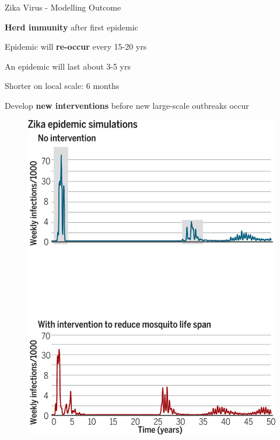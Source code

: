 \documentclass[table,notes]{beamer}\usepackage[]{graphicx}\usepackage[]{color}
\begin{document}
\begin{frame}[fragile]{Zika Virus - Modelling Outcome} %

\begin{minipage}{.52\textwidth}
\textbf{Herd immunity} after first epidemic  \par
\vspace{0.3cm}
Epidemic will \textbf{re-occur} every 15-20 yrs \par
\vspace{0.3cm}
An epidemic will last about 3-5 yrs \par
\vspace{0.1cm}
\hspace*{0.5cm}Shorter on local scale: 6 months \par
\vspace{0.3cm}
Develop \textbf{new interventions} before new large-scale outbreaks occur
\end{minipage} \hfill
\begin{minipage} {.45\textwidth}
\begin{figure}
  \centering
  \includegraphics[width=\textwidth,keepaspectratio]{Zika_results2.jpg}
\end{figure}
\end{minipage}\par
\vfill
{\scriptsize \cite{ferguson2016}}
\end{frame}
\end{document}
